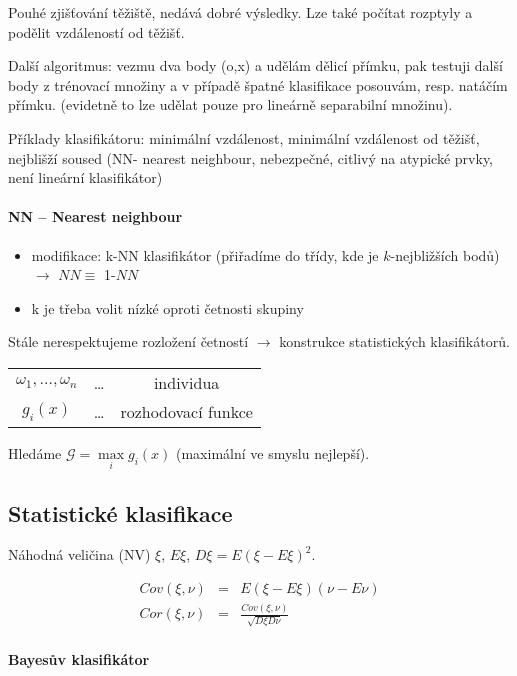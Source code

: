 Pouhé zjišťování těžiště, nedává dobré výsledky. Lze také počítat rozptyly a podělit vzdáleností od těžišť.


Další algoritmus: vezmu dva body (o,x) a udělám dělicí přímku, pak testuji další body z trénovací množiny
a v případě špatné klasifikace posouvám, resp. natáčím přímku. (evidetně to lze udělat pouze pro lineárně separabilní
množinu).

Příklady klasifikátoru: minimální vzdálenost, minimální vzdálenost od těžišť, nejblišží soused (NN- nearest neighbour,
nebezpečné, citlivý na atypické prvky, není lineární klasifikátor)

\paragraph{NN -- Nearest neighbour}
\begin{itemize}
\item modifikace: k-NN klasifikátor (přiřadíme do třídy, kde je $k$-nejbližších bodů)  $\rightarrow$ $NN\equiv$ 1-$NN$
\item k je třeba volit nízké oproti četnosti skupiny
\end{itemize}

Stále nerespektujeme rozložení četností $\rightarrow$ konstrukce statistických klasifikátorů.

\begin{tabular}{ccc}
$\omega_1,\dots,\omega_n$ &\dots& individua\\
$g_i(x)$ &\dots& rozhodovací funkce
\end{tabular}

Hledáme $\mathcal{G}=\max\limits_i g_i(x)$ (maximální ve smyslu nejlepší).

\subsection{Statistické klasifikace}

Náhodná veličina (NV) $\xi$, $E\xi$, $D\xi=E\left(\xi-E\xi\right)^2$.

\begin{eqnarray}
Cov(\xi,\nu)&=&E(\xi-E\xi)(\nu-E\nu)\\
Cor(\xi,\nu)&=&\frac{Cov(\xi,\nu)}{\sqrt{D\xi D\nu}}
\end{eqnarray}

\paragraph{Bayesův klasifikátor}

